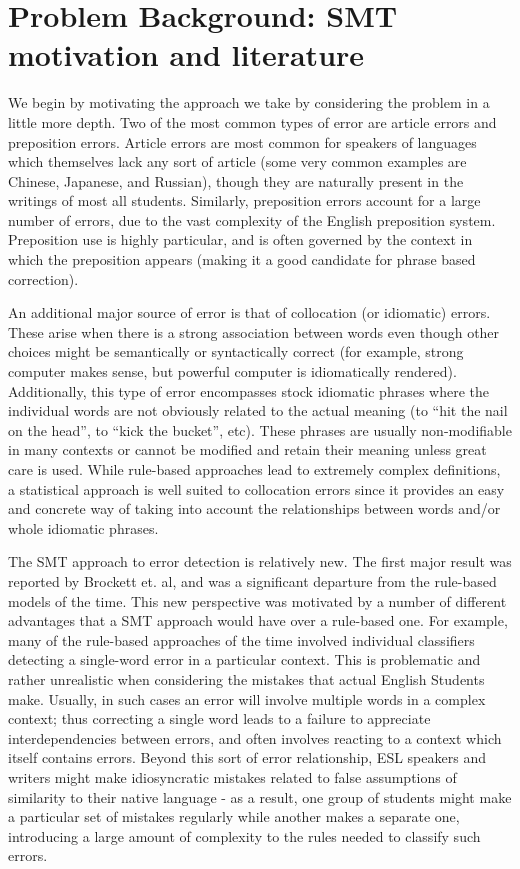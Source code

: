 \documentclass[11pt,letterpaper]{article}
\begin{document}
\section{Problem Background: SMT motivation and literature}
\indent We begin by motivating the approach we take by considering the problem in a little more depth. Two of the 
most common types of error are article errors and preposition errors. 
Article errors are most common for speakers of languages which themselves lack any sort of article 
(some very common examples are Chinese, Japanese, and Russian), though they are naturally present 
in the writings of most all students. Similarly, preposition errors account for a large number of 
errors, due to the vast complexity of the English preposition system. Preposition use is highly particular, 
and is often governed by the context in which the preposition appears (making it a good candidate for 
phrase based correction). \newline

\indent An additional major source of error is that of collocation (or idiomatic) errors. These 
arise when there is a strong association between words even though other choices might be semantically 
or syntactically correct (for example, strong computer makes sense, but powerful computer is idiomatically 
rendered). Additionally, this type of error encompasses stock idiomatic phrases where the individual words 
are not obviously related to the actual meaning (to “hit the nail on the head”, to “kick the bucket”, etc). 
These phrases are usually non-modifiable in many contexts or cannot be modified and retain their meaning 
unless great care is used. While rule-based approaches lead to extremely complex definitions, a 
statistical approach is well suited to collocation errors since it provides an easy and concrete way 
of taking into account the relationships between words and/or whole idiomatic phrases. \newline

\indent The SMT approach to error detection is relatively new. The first major result was reported by Brockett et. al, 
and was a significant departure from the rule-based models of the time. This new perspective was 
motivated by a number of different advantages that a SMT approach would have over a rule-based one. 
For example, many of the rule-based approaches of the time involved individual classifiers detecting
a single-word error in a particular context. This is problematic and rather unrealistic when considering
the mistakes that actual English Students make. Usually, in such cases an error will involve multiple words 
in a complex context; thus correcting a single word leads to a failure to appreciate interdependencies between 
errors, and often involves reacting to a context which itself contains errors. Beyond this sort of error 
relationship, ESL speakers and writers might make idiosyncratic mistakes related to false assumptions of 
similarity to their native language - as a result, one group of students might make a particular 
set of mistakes regularly while another makes a separate one, introducing a large amount of complexity 
to the rules needed to classify such errors. \newline
\end{document}
